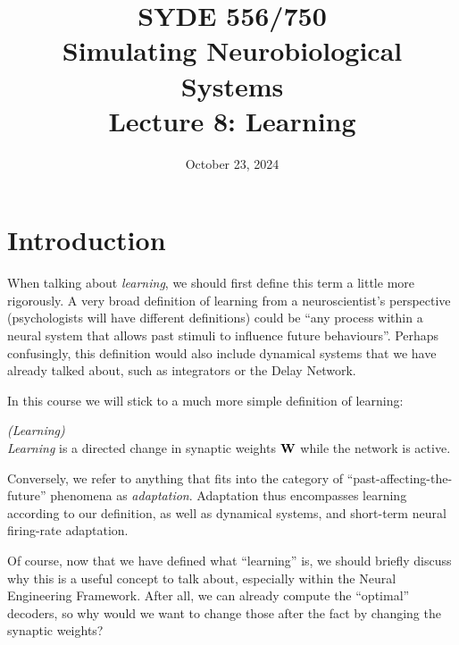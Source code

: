\documentclass[10pt,letterpaper,oneside]{article}
\date{October 23, 2024}
\title{SYDE 556/750 \\ Simulating Neurobiological Systems \\ Lecture 8: Learning}
\begin{document}

\section{Introduction}


When talking about \emph{learning}, we should first define this term a little more rigorously. A very broad definition of learning from a neuroscientist's perspective (psychologists will have different definitions) could be \enquote{any process within a neural system that allows past stimuli to influence future behaviours}. Perhaps confusingly, this definition would also include dynamical systems that we have already talked about, such as integrators or the Delay Network.

In this course we will stick to a much more simple definition of learning:
\begin{mdframed}
	\hfill\emph{(Learning)}\\
	\emph{Learning} is a directed change in synaptic weights ${\mathbf{W}}$ while the network is active.
\end{mdframed}
Conversely, we refer to anything that fits into the category of \enquote{past-affecting-the-future} phenomena as \emph{adaptation}. Adaptation thus encompasses learning according to our definition, as well as dynamical systems, and short-term neural firing-rate adaptation.

Of course, now that we have defined what \enquote{learning} is, we should briefly discuss why this is a useful concept to talk about, especially within the Neural Engineering Framework. After all, we can already compute the \enquote{optimal} decoders, so why would we want to change those after the fact by changing the synaptic weights?
\end{document}
